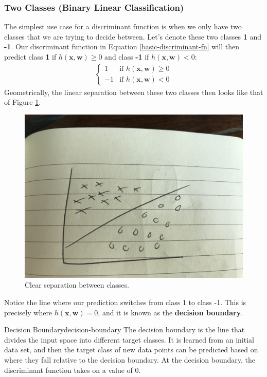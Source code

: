 \subsubsection{Two Classes (Binary Linear Classification)}
The simplest use case for a discriminant function is when we only have two classes that we are trying to decide between. Let's denote these two classes \textbf{1} and \textbf{-1}. Our discriminant function in Equation \ref{basic-discriminant-fn} will then predict class \textbf{1} if $h(\textbf{x}, \textbf{w}) \geq 0$ and class \textbf{-1} if $h(\textbf{x}, \textbf{w}) < 0$:
\begin{align*}
	\begin{cases} 
    	1 & \text{if } h(\textbf{x}, \textbf{w}) \geq 0 \\
    	-1 & \text{if } h(\textbf{x}, \textbf{w}) < 0
   \end{cases}
\end{align*}
Geometrically, the linear separation between these two classes then looks like that of Figure \ref{fig:lin-sep-bn-classes}.
\begin{figure}
    \centering
    \includegraphics[width=0.5\paperwidth]{../Classification/fig/lin_sep_bn_classes.jpg}
    \caption{Clear separation between classes.}
    \label{fig:lin-sep-bn-classes}
\end{figure}
Notice the line where our prediction switches from class 1 to class -1. This is precisely where $h(\textbf{x}, \textbf{w}) = 0$, and it is known as the \textbf{decision boundary}.

\begin{definition}{Decision Boundary}{decision-boundary}
	The decision boundary is the line that divides the input space into different target classes. It is learned from an initial data set, and then the target class of new data points can be predicted based on where they fall relative to the decision boundary. At the decision boundary, the discriminant function takes on a value of 0.
\end{definition}

